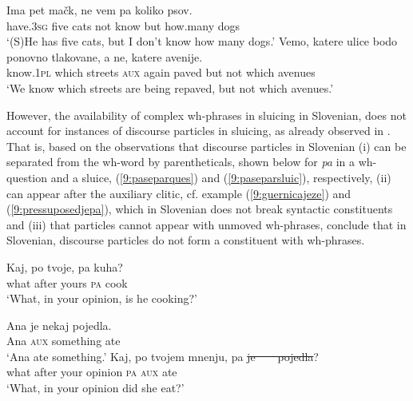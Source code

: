 \documentclass[output=paper,
modfonts,
newtxmath,
hidelinks
]{langscibook}
\begin{document}
\begin{exe}
\ex \begin{xlist}
\ex \gll Ima pet mačk, ne vem pa koliko psov.\\
have.\textsc{3sg} five cats not know but how.many dogs\\
\trans `(S)He has five cats, but I don't know how many dogs.'
\ex \gll	Vemo, katere ulice bodo ponovno tlakovane, a ne, katere avenije. \\
		know.\textsc{1pl} which streets \textsc{aux} 	again paved but not which avenues \\
\trans `We know which streets are being repaved, but not which avenues.'
\end{xlist}\end{exe}

\noindent However, the availability of complex wh-phrases in sluicing in Slovenian, does not account for instances of discourse particles in sluicing, as already observed in \cite{marusicetal2015}. That is, based on the observations that discourse particles in Slovenian (i) can be separated from the wh-word by parentheticals, shown below for \textit{pa} in a wh-question and a sluice, (\ref{9:paseparques}) and (\ref{9:paseparsluic}), respectively, (ii) can appear after the auxiliary clitic, cf. example (\ref{9:guernicajeze}) and (\ref{9:pressuposedjepa}), which in Slovenian does not break syntactic constituents and (iii) that particles cannot appear with unmoved wh-phrases, \cite{marusicetal2015} conclude that in Slovenian, discourse particles do not form a constituent with wh-phrases. 

\begin{exe}
\ex \label{9:paseparques}
\gll Kaj, po tvoje, pa kuha?\\
	what after yours \textsc{pa} cook\\
\trans  `What, in your opinion, is he cooking?'
\ex \begin{xlist}
\ex \label{9:paseparsluic}
\gll 	Ana je nekaj pojedla. \\
 		Ana \textsc{aux} something ate\\
 \trans  `Ana ate something.'
\ex \gll Kaj, po tvojem mnenju, pa \sout{je}\sout{\ }\sout{\ }\sout{\ }\sout{\ }\sout{pojedla}?\\
 		what after your opinion \textsc{pa} {\textsc{aux} ate}\\
\trans `What, in your opinion did she eat?'
\end{xlist}\end{exe}
 
\end{document}
